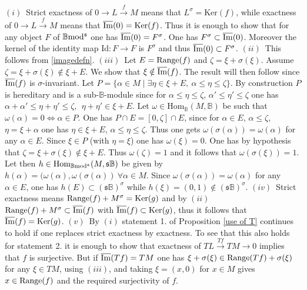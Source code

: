 \documentclass[12pt]{article}
\def\Hom{{\rm Hom}}
\def\id{{\rm id}}
\def\B{{\mathbb B}}
\def\imm{\overline{\rm Im}}
\def\strg{strict }
\def\Strg{Strict }
\def\id{{\mbox{Id}}}
\def\ker{{\mbox{Ker}}}
\def\Hom {{\mbox{Hom}}}
\def\yb{\mathfrak{s}}
\def\b2{{\rm \B mod^{\mathfrak s}}}
\begin{document}
 \proof $(i)$~\Strg exactness of $0 \to L\stackrel{f}{\to}M$ means that  $L^\sigma=\ker(f)$,
 while exactness of $0 \to L\stackrel{f}{\to}M$ means that $\imm(0)=\ker(f)$. Thus it is enough to show that for any object $F$ of $\b2$ one has  $\imm(0)=F^\sigma$. One has $ F^\sigma\subset \imm(0)$. Moreover the kernel of the identity map $\id:F\to F$ is $F^\sigma $ and thus $\imm(0)\subset F^\sigma$. \newline
 $(ii)$~This follows from  \eqref{imagedefn}.\newline
 $(iii)$~Let $E={\rm Range}(f)$ and $\zeta=\xi+\sigma(\xi)$. Assume $\zeta=\xi+\sigma(\xi)\notin \xi+E $. We show that $\xi\notin \imm(f)$. The result will then follow since $\imm(f)$ is $\sigma$-invariant. Let
$
P=\{\alpha \in M\mid \exists \eta\in \xi+E,\ \alpha\leq \eta\leq \zeta\}.
$
  By construction $P$ is hereditary and is a sub-$\B$-module since for $\alpha\leq \eta\leq \zeta$, $\alpha'\leq \eta'\leq \zeta$ one has 
  $
  \alpha+\alpha'\leq \eta+\eta'\leq \zeta, \  \  \eta+\eta'\in \xi+E
  $.
  Let $\omega\in \Hom_\B(M,\B)$ be such that $\omega(\alpha)=0\Leftrightarrow \alpha \in P$. One has $P\cap E=[0,\zeta]\cap E$, since for $\alpha\in E$, $\alpha\leq \zeta$,   $\eta=\xi +\alpha$ one has $\eta\in \xi+E$, $\alpha\leq \eta\leq \zeta$. Thus  one gets $\omega(\sigma(\alpha))=\omega(\alpha)$ for any $\alpha \in E$. Since $\xi \in P$  (with $\eta=\xi$) one has $\omega(\xi)=0$. One has by hypothesis that $\zeta=\xi+\sigma(\xi)\notin \xi+E $. Thus $\omega(\zeta)=1$ and it follows that $\omega(\sigma(\xi))=1$.   
  Let then $h\in \Hom_\b2(M,\yb\B)$ be given by 
  $
  h(\alpha)=(\omega(\alpha),\omega(\sigma(\alpha))~ \forall\alpha \in M
  $.
  Since $\omega(\sigma(\alpha))=\omega(\alpha)$ for any $\alpha \in E$, one has $h(E)\subset (\yb\B)^\sigma$ while $h(\xi)=(0,1)\notin (\yb\B)^\sigma$.\newline
 $(iv)$~\Strg exactness means ${\rm Range}(f)+M^\sigma=\ker(g)$ and by $(ii)$ ${\rm Range}(f)+M^\sigma\subset \imm(f)$ with $\imm(f)\subset \ker(g)$, thus it follows that $\imm(f)=\ker(g)$.\newline
 $(v)$~By $(i)$  statement 1. of Proposition \ref{use of T} continues to hold if one replaces \strg exactness by exactness. To see that this also holds for statement 2. it is enough to show that exactness of $TL\stackrel{Tf}{\to}TM\to 0$ implies that $f$ is surjective. But if $\imm(Tf)=TM$ one has $\xi+\sigma(\xi)\in {\rm Range}(Tf)+\sigma(\xi)$ for any $\xi\in TM$, using $(iii)$, and taking $\xi=(x,0)$ for $x\in M$  gives $x\in {\rm Range}(f)$ and the required surjectivity of $f$. \newline
\end{document}
